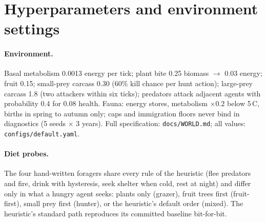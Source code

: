 \documentclass[10pt]{article}
\begin{document}
\appendix
\section{Hyperparameters and environment settings}
\begin{table}[h]
  \centering\small
  \caption{Learner hyperparameters (identical for both arms except the core).}
  \label{tab:hparams}
\end{table}

\paragraph{Environment.} Basal metabolism 0.0013 energy per tick; plant bite 0.25 biomass $\rightarrow$ 0.03 energy;
fruit 0.15; small-prey carcass 0.30 (60\% kill chance per hunt action); large-prey carcass 1.8 (two attackers within six
ticks); predators attack adjacent agents with probability 0.4 for 0.08 health. Fauna: energy stores, metabolism
$\times0.2$ below 5\,\textdegree C, births in spring to autumn only; caps and immigration floors never bind in diagnostics
(5 seeds $\times$ 3 years). Full specification: \texttt{docs/WORLD.md}; all values: \texttt{configs/default.yaml}.

\paragraph{Diet probes.} The four hand-written foragers share every rule of the heuristic (flee predators and fire,
drink with hysteresis, seek shelter when cold, rest at night) and differ only in what a hungry agent seeks: plants only
(grazer), fruit trees first (fruit-first), small prey first (hunter), or the heuristic's default order (mixed). The
heuristic's standard path reproduces its committed baseline bit-for-bit.
\end{document}
